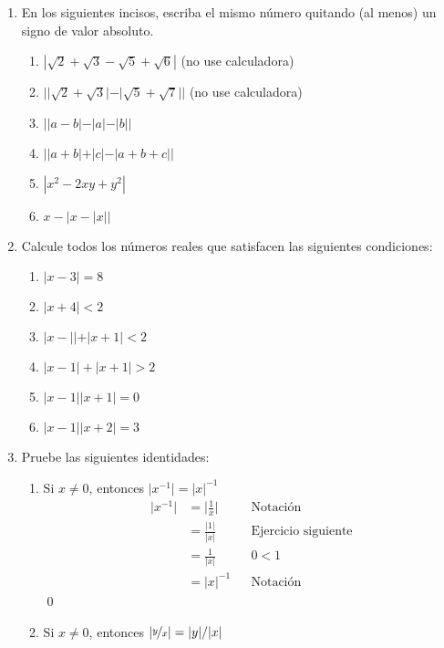 \documentclass[11pt]{article}
\begin{document}
\begin{enumerate}
 \item En los siguientes incisos, escriba el mismo número quitando (al menos) un signo de valor absoluto. \begin{enumerate}[label=(\alph*)]
  \item $|\sqrt{2}+\sqrt{3}-\sqrt{5}+\sqrt{6}|$ (no use calculadora)
  \item $||\sqrt{2}+\sqrt{3}|-|\sqrt{5}+\sqrt{7}||$ (no use calculadora)
  \item $||a-b|-|a|-|b||$
  \item $||a+b|+|c|-|a+b+c||$
  \item $|x^2-2xy+y^2|$
  \item $x-|x-|x||$
 \end{enumerate}
 \item Calcule todos los números reales que satisfacen las siguientes condiciones:\begin{enumerate}[label=(\alph*)]
 \item $|x-3|=8$
 \item $|x+4|<2$
 \item $|x-||+|x+1|<2$
 \item $|x-1|+|x+1|>2$
 \item $|x-1||x+1|=0$
 \item $|x-1||x+2|=3$
 \end{enumerate}
 \item Pruebe las siguientes identidades: \begin{enumerate}[label=(\alph*)]
  \item Si $x\neq 0$, entonces $\big|x^{-1}\big|=|x|^{-1}$
  \begin{align*}
   \big|x^{-1}\big| &= \bigg|\frac{1}{x}\bigg| && \text{Notación}\\
   &= \frac{|1|}{|x|} && \text{Ejercicio siguiente}\\
   &= \frac{1}{|x|} && \text{$0<1$}\\
   &= |x|^{-1} && \text{Notación}
  \end{align*} \qed

  \item Si $x\neq 0$, entonces $|\nicefrac{y}{x}|=|y|/|x|$
   

\end{enumerate}
\end{enumerate}
\end{document}
